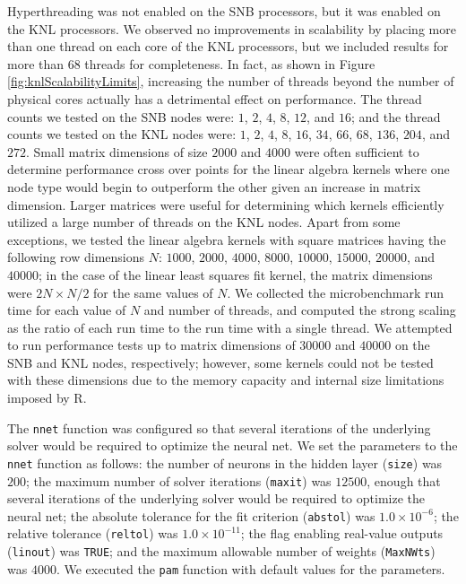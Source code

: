 Hyperthreading was not enabled on the SNB processors, but it was enabled on the KNL
processors. We observed no improvements in scalability by placing more than one thread on
each core of the KNL processors, but we included results for more than 68 threads for
completeness. In fact, as shown in Figure \ref{fig:knlScalabilityLimits}, increasing the
number of threads beyond the number of physical cores actually has a detrimental effect on
performance. The thread counts we tested on the SNB nodes were: $1$, $2$, $4$, $8$, $12$, and
$16$; and the thread counts we tested on the KNL nodes were: $1$, $2$, $4$, $8$, $16$, $34$,
$66$, $68$, $136$, $204$, and $272$. Small matrix dimensions of size $2000$ and $4000$
were often sufficient to determine performance cross over points for the linear algebra
kernels where one node type would begin to outperform the other given an increase in
matrix dimension. Larger matrices were useful for determining which kernels efficiently
utilized a large number of threads on the KNL nodes. Apart from some
exceptions, we tested the linear algebra kernels with square matrices having the following
row dimensions $N$: $1000$, $2000$, $4000$, $8000$, $10000$, $15000$, $20000$, and
$40000$; in the case of the linear least squares fit kernel, the matrix dimensions were
$2N \times N/2$ for the same values of $N$.
We collected the microbenchmark run time for each value of $N$ and number of threads, and
computed the strong scaling as the ratio of each run time to the run time with a single
thread.  We attempted to run performance tests up to matrix
dimensions of $30000$ and $40000$ on the SNB and KNL nodes,
respectively; however, some kernels could not be tested with these dimensions due to the
memory capacity and internal size limitations imposed by R.

The \texttt{nnet} function was configured so that several iterations of the underlying
solver would be required to optimize the neural net.
We set the parameters to the \texttt{nnet} function as follows:
the number of neurons in the hidden layer (\texttt{size}) was $200$;
the maximum number of solver iterations (\texttt{maxit}) was $12500$, enough that several
iterations of the underlying solver would be required to optimize the neural net;
the absolute tolerance for the fit criterion (\texttt{abstol}) was $1.0\times 10^{-6}$;
the relative tolerance (\texttt{reltol}) was $1.0\times 10^{-11}$;
the flag enabling real-value outputs (\texttt{linout}) was \texttt{TRUE};
and the maximum allowable number of weights (\texttt{MaxNWts}) was $4000$.
We executed the \texttt{pam} function with default values for the parameters.

